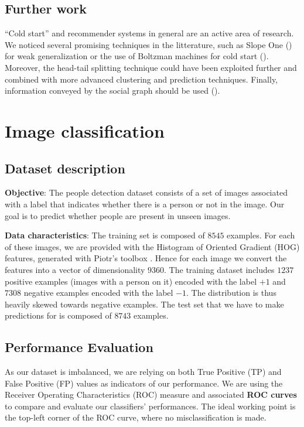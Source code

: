 \documentclass[10pt,a4paper]{article}
\begin{document}
  \subsection{Further work}
  ``Cold start'' and recommender systems in general are an active area of research. We noticed several promising techniques in the litterature, such as Slope One (\cite{slope-one}) for weak generalization or the use of Boltzman machines for cold start (\cite{cold-start-metrics}). Moreover, the head-tail splitting technique could have been exploited further and combined with more advanced clustering and prediction techniques. Finally, information conveyed by the social graph should be used (\cite{top-k-with-social-network}).

\section{Image classification}

  \subsection{Dataset description}
  \textbf{Objective}: The people detection dataset consists of a set of images associated with a label that indicates whether there is a person or not in the image. Our goal is to predict whether people are present in unseen images.

  \textbf{Data characteristics}: The training set is composed of $8545$ examples. For each of these images, we are provided with the Histogram of Oriented Gradient (HOG) features, generated with Piotr's toolbox \cite{piotrtoolbox}. Hence for each image we convert the features into a vector of dimensionality $9360$. The training dataset includes $1237$ positive examples (images with a person on it) encoded with the label $+1$ and $7308$ negative examples encoded with the label $-1$. The distribution is thus heavily skewed towards negative examples. The test set that we have to make predictions for is composed of $8743$ examples.

  \subsection{Performance Evaluation}
  As our dataset is imbalanced, we are relying on both True Positive (TP) and False Positive (FP) values as indicators of our performance. We are using the Receiver Operating Characteristics (ROC) measure and associated \textbf{ROC curves} \cite{rocanalysis} to compare and evaluate our classifiers' performances. The ideal working point is the top-left corner of the ROC curve, where no misclassification is made.
\end{document}

